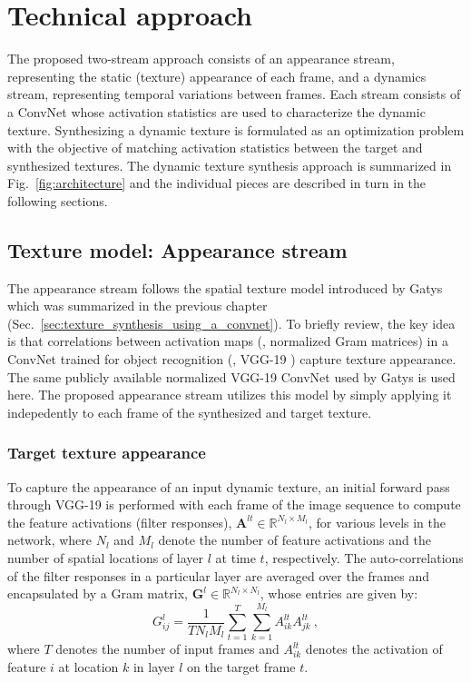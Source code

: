 \chapter{Technical approach}

The proposed two-stream approach consists of an appearance
stream, representing the static (texture) appearance of each frame,
and a dynamics stream, representing temporal 
variations between frames.
Each stream consists of a ConvNet whose activation 
statistics are used to characterize the dynamic texture.
Synthesizing a dynamic texture is formulated as an optimization 
problem with the objective of matching activation 
statistics between the target and synthesized textures.
The dynamic texture synthesis approach is summarized in Fig.\ \ref{fig:architecture}
and the individual pieces are described in turn in the
following sections.



\section{Texture model: Appearance stream}

The appearance stream follows the spatial texture model
introduced by Gatys \etal \cite{gatys2015} which was summarized in the previous chapter (Sec.\ \ref{sec:texture_synthesis_using_a_convnet}).
To briefly review, the key idea is that correlations between activation maps (\ie, normalized Gram matrices) in a 
ConvNet trained for 
object recognition (\eg, VGG-19 \cite{simonyan2014very}) 
capture texture appearance.
The same publicly available normalized VGG-19 ConvNet \cite{simonyan2014very} used by Gatys \etal \cite{gatys2015} is used here. The proposed appearance stream utilizes this model by simply applying it indepedently to each frame of the synthesized and target texture.

\subsection{Target texture appearance}

To capture the appearance of an input dynamic texture, an initial forward pass through VGG-19 is performed with each frame of the image sequence to compute the feature activations (filter responses),
$\mathbf{A}^{lt} \in \mathbb{R}^{N_l\times M_l}$, for various
levels in the network, where $N_l$ and $M_l$ denote
the number of feature activations and the number of spatial locations of layer
$l$ at time $t$, respectively.
The auto-correlations of the filter responses in a particular layer are
averaged over the frames and encapsulated by a Gram matrix,
$\mathbf{G}^{l} \in \mathbb{R}^{N_l \times N_l}$, whose
entries are given by:
\begin{equation}
	G_{ij}^l = \frac{1}{T N_l M_l} \sum_{t=1}^T \sum_{k=1}^{M_l} A_{ik}^{lt} A_{jk}^{lt}\ ,
	\label{eq:gram_target}
\end{equation}
where $T$ denotes the number of input frames
and $A_{ik}^{lt}$ denotes the activation of feature $i$ at
location $k$ in layer $l$ on the target frame $t$.

